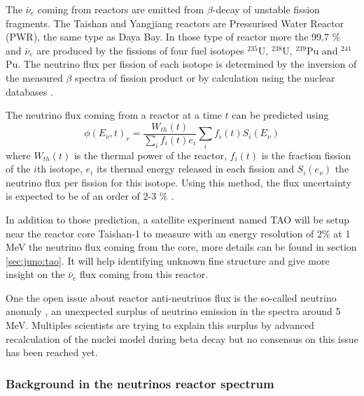 \documentclass[../main.tex]{subfiles}
\begin{document}
The $\bar{\nu}_e$ coming from reactors are emitted from $\beta$-decay of unstable fission fragments. The Taishan and Yangjiang reactors are Pressurised Water Reactor (PWR), the same type as Daya Bay. In those type of reactor more the 99.7 \% and $\bar{\nu}_e$ are produced by the fissions of four fuel isotopes $^{235}$U, $^{238}$U, $^{239}$Pu and $^{241}$Pu. The neutrino flux per fission of each isotope is determined by the inversion of the measured $\beta$ spectra of fission product \cite{hahn_antineutrino_1989, mueller_improved_2011, von_feilitzsch_experimental_1982, schreckenbach_determination_1985, huber_determination_2011} or by calculation using the nuclear databases \cite{vogel_reactor_1981, dwyer_spectral_2015}.

The neutrino flux coming from a reactor at a time $t$ can be predicted using
\begin{equation}
  \phi(E_\nu, t)_r = \frac{W_{th}(t)}{\sum_i f_i(t) e_i} \sum_i f_i(t) S_i(E_\nu)
\end{equation}
where $W_{th}(t)$ is the thermal power of the reactor, $f_i(t)$ is the fraction fission of the $i$th isotope, $e_i$ its thermal energy released in each fission and $S_i(e_\nu)$ the neutrino flux per fission for this isotope. Using this method, the flux uncertainty is expected to be of an order of 2-3 \% \cite{juno_collaboration_sub-percent_2022}.

In addition to those prediction, a satellite experiment named TAO\cite{juno_collaboration_tao_2020} will be setup near the reactor core Taishan-1 to measure with an energy resolution of 2\% at 1 MeV the neutrino flux coming from the core, more details can be found in section \ref{sec:juno:tao}. It will help identifying unknown fine structure and give more insight on the $\bar{\nu}_e$ flux coming from this reactor.

One  the open issue about reactor anti-neutrinos flux is the so-called neutrino anomaly \cite{mention_reactor_2011}, an unexpected surplus of neutrino emission in the spectra around 5 MeV.
Multiples scientists are trying to explain this surplus by advanced recalculation of the nuclei model during beta decay \cite{kopeikin_reevaluating_2021, letourneau_origin_2023} but no consensus on this issue has been reached yet.

\subsubsection{Background in the neutrinos reactor spectrum}
\end{document}
